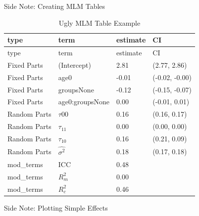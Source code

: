 \begin{frame}[fragile]{Side Note: Creating MLM Tables}

\small

\begin{Shaded}
\begin{Highlighting}[]
\NormalTok{(} \NormalTok{)}
\OperatorTok{::} \NormalTok{)}
\end{Highlighting}
\end{Shaded}

\begin{longtable}[]{@{}llll@{}}
\caption{Ugly MLM Table Example}\tabularnewline
\toprule
type & term & estimate & CI\tabularnewline
\midrule
\endfirsthead
\toprule
type & term & estimate & CI\tabularnewline
\midrule
\endhead
Fixed Parts & (Intercept) & 2.81 & (2.77, 2.86)\tabularnewline
Fixed Parts & age0 & -0.01 & (-0.02, -0.00)\tabularnewline
Fixed Parts & groupsNone & -0.12 & (-0.15, -0.07)\tabularnewline
Fixed Parts & age0:groupsNone & 0.00 & (-0.01, 0.01)\tabularnewline
Random Parts & \(\tau{00}\) & 0.16 & (0.16, 0.17)\tabularnewline
Random Parts & \(\tau_{11}\) & 0.00 & (0.00, 0.00)\tabularnewline
Random Parts & \(\tau_{10}\) & 0.16 & (0.21, 0.09)\tabularnewline
Random Parts & \(\hat{\sigma^2}\) & 0.18 & (0.17, 0.18)\tabularnewline
mod\_terms & ICC & 0.48 &\tabularnewline
mod\_terms & \(R^2_m\) & 0.00 &\tabularnewline
mod\_terms & \(R^2_c\) & 0.46 &\tabularnewline
\bottomrule
\end{longtable}

\normalsize

\end{frame}

\begin{frame}[fragile]{Side Note: Plotting Simple Effects}

\footnotesize

\begin{Shaded}
\begin{Highlighting}[]
 \NormalTok{, }
 \NormalTok{, }
         \NormalTok{)}
\end{Highlighting}
\end{Shaded}

\end{frame}

